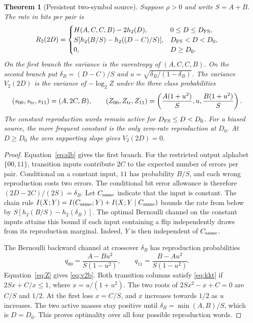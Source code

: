 \documentclass[11pt,letterpaper]{article}
\newtheorem{theorem}{Theorem}
\theoremstyle{definition}
\newcommand{\hx}{h_2}
\begin{document}
\begin{theorem}[Persistent two-symbol source]\label{thm:two}
Suppose $\rho>0$ and write $S=A+B$. The rate in bits per pair is
\begin{equation}
 R_2(2D)=
 \begin{cases}
 H(A,C,C,B)-2\hx(D), &0\le D\le D_{\rm FS},\\
 S[\hx(B/S)-\hx((D-C)/S)], &D_{\rm FS}<D<D_0,\\
 0, &D\ge D_0 .
 \end{cases}                                                     \label{eq:r2}
\end{equation}
On the first branch the variance is the varentropy of $(A,C,C,B)$. On the second branch put $\delta_B=(D-C)/S$ and $u=\sqrt{\delta_B/(1-\delta_B)}$. The variance $V_2(2D)$ is the variance of $-\log_2Z$ under the three class probabilities
\begin{equation}
 (s_{00},s_{\rm tr},s_{11})=(A,2C,B),\qquad
 (Z_{00},Z_{\rm tr},Z_{11})=\left(\frac{A(1+u^2)}{S},u,\frac{B(1+u^2)}{S}\right).
 \label{eq:v2b}
\end{equation}
The constant reproduction words remain active for $D_{\rm FS}\le D<D_0$. For a biased source, the more frequent constant is the only zero-rate reproduction at $D_0$. At $D\ge D_0$ the zero supporting slope gives $V_2(2D)=0$.
\end{theorem}
\begin{proof}
Equation~\eqref{eq:slb} gives the first branch. For the restricted output alphabet $\{00,11\}$, transition inputs contribute $2C$ to the expected number of errors per pair. Conditional on a constant input, $11$ has probability $B/S$, and each wrong reproduction costs two errors. The conditional bit error allowance is therefore $(2D-2C)/(2S)=\delta_B$. Let $C_{\rm same}$ indicate that the input is constant. The chain rule $I(X;Y)=I(C_{\rm same};Y)+I(X;Y\mid C_{\rm same})$ bounds the rate from below by $S[\hx(B/S)-\hx(\delta_B)]$. The optimal Bernoulli channel on the constant inputs attains this bound if each input containing a flip independently draws from its reproduction marginal. Indeed, $Y$ is then independent of $C_{\rm same}$.

The Bernoulli backward channel at crossover $\delta_B$ has reproduction probabilities
\[
 q_{00}=\frac{A-Bu^2}{S(1-u^2)},\qquad q_{11}=\frac{B-Au^2}{S(1-u^2)} .
\]
Equation~\eqref{eq:Z} gives \eqref{eq:v2b}. Both transition columns satisfy \eqref{eq:kkt} if $2Sx+C/x\le1$, where $x=u/(1+u^2)$. The two roots of $2Sx^2-x+C=0$ are $C/S$ and $1/2$. At the first loss $x=C/S$, and $x$ increases towards $1/2$ as $u$ increases. The two active masses stay positive until $\delta_B=\min(A,B)/S$, which is $D=D_0$. This proves optimality over all four possible reproduction words.
\end{proof}
\end{document}
